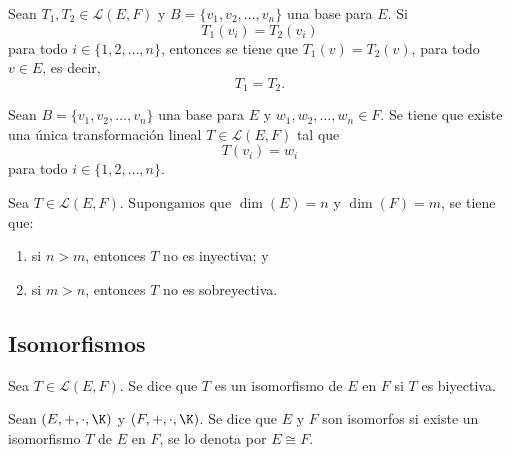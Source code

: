 \documentclass[a4,11pt]{aleph-notas}
\begin{document}
\begin{teo}
    Sean $T_1,T_2 \in \mathcal{L}(E,F)$ y $B= \{v_1, v_2, \ldots, v_n\}$ una base para $E$. Si
    \[
        T_1(v_i) = T_2(v_i)
    \]
    para todo $i \in \{1, 2, \ldots, n\}$, entonces se tiene que $T_1(v)=T_2(v)$, para todo $v\in E$, es decir, 
    \[
        T_1 = T_2.
    \]
\end{teo}

\begin{teo}
    Sean $B= \{v_1, v_2, \ldots, v_n\}$ una base para $E$ y $w_1, w_2, \ldots, w_n\in F$. Se tiene que existe una única transformación lineal $T \in \mathcal{L}(E,F)$ tal que
    \[
        T(v_i) = w_i
    \]
    para todo $i\in \{1, 2, \ldots, n\}$.
\end{teo}


\begin{teo}
    Sea $T \in \mathcal{L}(E,F)$. Supongamos que $\dim(E) = n$ y $\dim(F) = m$, se tiene que:
    \begin{enumerate}
        \item si $n > m$, entonces $T$ no es inyectiva; y
        \item si $m > n$, entonces $T$ no es sobreyectiva.
    \end{enumerate}
\end{teo} 

\subsection{Isomorfismos}


\begin{defi}[Isomorfismo]
    Sea $T \in \mathcal{L}(E,F)$. Se dice que $T$ es un isomorfismo de $E$ en $F$ si $T$ es biyectiva.
\end{defi}

\begin{defi}
    Sean $(E,+,\cdot,\K)$ y $(F,+,\cdot,\K)$. Se dice que $E$ y $F$ son isomorfos si existe un isomorfismo $T$ de $E$ en $F$, se lo denota por $E \cong F$.
\end{defi}
\end{document}
